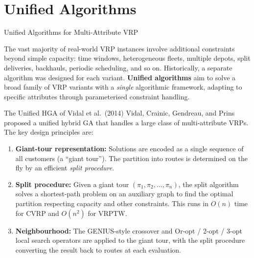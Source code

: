 \documentclass[aspectratio=169,10pt]{beamer}
\begin{document}
\section{Unified Algorithms}

\begin{frame}[allowframebreaks]{Unified Algorithms for Multi-Attribute VRP}

  The vast majority of real-world VRP instances involve additional
  constraints beyond simple capacity: time windows, heterogeneous
  fleets, multiple depots, split deliveries, backhauls, periodic
  scheduling, and so on.  Historically, a separate algorithm was
  designed for each variant.  \textbf{Unified algorithms} aim to solve
  a broad family of VRP variants with a \emph{single} algorithmic
  framework, adapting to specific attributes through parameterised
  constraint handling.

  \begin{block}{The Unified HGA of Vidal et al.\ (2014)}
    Vidal, Crainic, Gendreau, and Prins proposed a unified hybrid GA
    that handles a large class of multi-attribute VRPs.  The key
    design principles are:
    \begin{enumerate}
      \item \textbf{Giant-tour representation:} Solutions are encoded as
            a single sequence of all customers (a ``giant tour'').  The
            partition into routes is determined on the fly by an efficient
            \emph{split procedure}.
      \item \textbf{Split procedure:} Given a giant tour
            $(\pi_1, \pi_2, \ldots, \pi_n)$, the split algorithm solves
            a shortest-path problem on an auxiliary graph to find the
            optimal partition respecting capacity and other constraints.
            This runs in $O(n)$ time for CVRP and $O(n^2)$ for VRPTW.
      \item \textbf{Neighbourhood:} The GENIUS-style crossover and
            Or-opt / 2-opt / 3-opt local search operators are applied
            to the giant tour, with the split procedure converting
            the result back to routes at each evaluation.
    \end{enumerate}
  \end{block}

  \framebreak


\end{frame}
\end{document}

